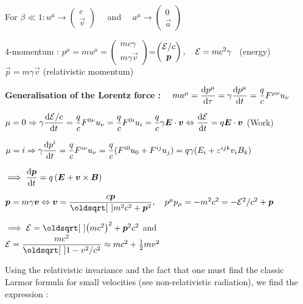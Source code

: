 \item For $\beta \ll 1 : u^{\mu} \rightarrow 
\begin{pmatrix}
c\\
\vec{v}
\end{pmatrix} \quad $ and $ \quad a^{\mu} \rightarrow
\begin{pmatrix}
0\\
\vec{a}
\end{pmatrix}$


\item 4-momentum : $p^{\mu} = m u^{\mu}= 
\begin{pmatrix}
    mc\gamma \\
    m\gamma \Vec{v}
\end{pmatrix}$=$\begin{pmatrix}
    \E/c \\
    \Vec{p}
\end{pmatrix}, \quad \E = mc^2\gamma $ \ (energy) \ $\vec{p} = m\gamma \Vec{v}$ (relativistic momentum)


\item[] \textbf{Generalisation of the Lorentz force :} $\quad ma^{\mu} = \dfrac{\textrm{d} p^\mu}{\textrm{d} \tau} = \gamma\dfrac{\textrm{d} p^\mu}{\textrm{d} t} = \dfrac{q}{c} F^{\mu\nu}u_{\nu}$

\item $\mu = 0 \Rightarrow \gamma\dfrac{\ud \E/c}{\ud t} = \dfrac{q}{c} F^{0\nu}u_{\nu}= \dfrac{q}{c} F^{0i}u_{i} = \dfrac{q}{c}\gamma\Vec{E}\cdot\Vec{v} \Leftrightarrow \dfrac{\ud \E}{\ud t}= q\Vec{E}\cdot\Vec{v}$ \quad (Work)  

\item $\mu = i \Rightarrow \gamma\dfrac{\textrm{d} p^i}{\textrm{d} t} = \dfrac{q}{c} F^{i\nu}u_{\nu} = \dfrac{q}{c} (F^{i0}u_{0} +F^{ij}u_{j})= q\gamma(E_i + \varepsilon^{ijk}v_iB_k)$

$ \implies \dfrac{\ud \Vec{p} }{\ud t}  = q\left(\vec{E} + \vec{v} \times \vec{B} \right)$


\item $\vec{p} = m\gamma\vec{v} \Leftrightarrow \vec{v} = \dfrac{c\vec{p}}{\sqrt{m^2c^2 + \vec{p}^2}}, \quad p^{\mu}p_{\mu} = -m^2c^2 = -\E^2/c^2 +\Vec{p}$

$ \implies \E = \sqrt{\left(mc^2\right)^2 + \vec{p}^2c^2}$ \quad and \quad $\E = \dfrac{mc^2}{\sqrt{1-v^2/c^2}} \approx mc^2 + \half mv^2$  

\squishend
{}
\squishlist
\item[] Using the relativistic invariance and the fact that one must find the classic Larmor formula for small velocities (see non-relativistic radiation), we find the expression :


